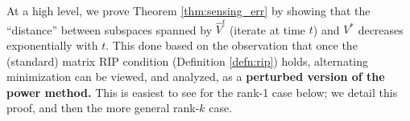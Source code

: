 \documentclass[11pt]{article}
\theoremstyle{plain}
\newtheorem{theorem}{Theorem}[section]
\theoremstyle{definition}
\newcommand{\rmn}{\mathbb{R}^{m \times n}}
\newcommand{\dist}{\mathrm{dist}}
\newcommand{\calA}{\mathcal{A}}
\newcommand{\aff}{{\mathcal A}}
\newcommand{\so}{\sigma^*}
\begin{document}
At a high level, we prove Theorem \ref{thm:sensing_err} by showing that  the ``distance'' between subspaces spanned by $\widehat{V}^t$ (iterate at time $t$) and $V^*$ decreases exponentially with $t$. This done based on the observation that once the (standard) matrix RIP condition (Definition \ref{defn:rip}) holds, alternating minimization can be viewed, and analyzed, as a {\bf perturbed version of the power method.} This is easiest to see for the rank-1 case below; we detail this proof, and then the more general rank-$k$ case.
\end{document}
